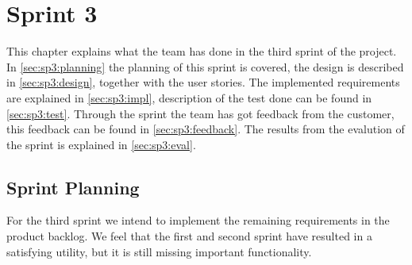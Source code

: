 \chapter{Sprint 3}
This chapter explains what the team has done in the third sprint of the 
project. In \autoref{sec:sp3:planning} the planning of this sprint is covered, 
the design is described in \autoref{sec:sp3:design}, together with the user 
stories. The implemented requirements are explained in \autoref{sec:sp3:impl}, 
description of the test done can be found in \autoref{sec:sp3:test}. Through 
the sprint the team has got feedback from the customer, this feedback can be 
found in \autoref{sec:sp3:feedback}.  The results from the evalution of the 
sprint is explained in \autoref{sec:sp3:eval}.

\section{Sprint Planning}
\label{sec:sp3:planning}
For the third sprint we intend to implement the remaining requirements in the product backlog. We feel that the first and second sprint have resulted in a satisfying \gls{utility}, but it is still missing important functionality.

